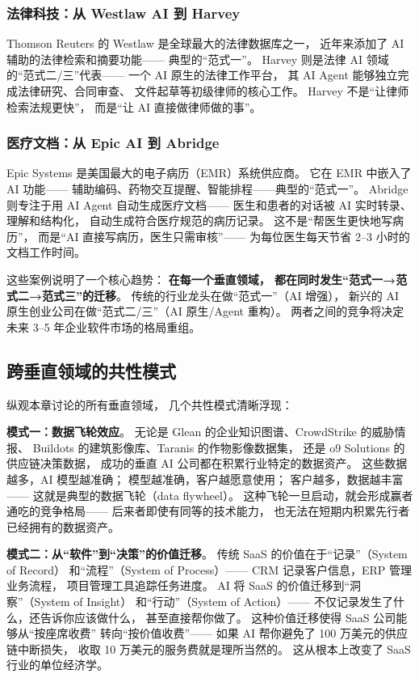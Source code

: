 \subsubsection{法律科技：从 Westlaw AI 到 Harvey}
Thomson Reuters 的 Westlaw 是全球最大的法律数据库之一，
近年来添加了 AI 辅助的法律检索和摘要功能——
典型的``范式一''。
Harvey 则是法律 AI 领域的``范式二/三''代表——
一个 AI 原生的法律工作平台，
其 AI Agent 能够独立完成法律研究、合同审查、
文件起草等初级律师的核心工作。
Harvey 不是``让律师检索法规更快''，
而是``让 AI 直接做律师做的事''。

\subsubsection{医疗文档：从 Epic AI 到 Abridge}
Epic Systems 是美国最大的电子病历（EMR）系统供应商。
它在 EMR 中嵌入了 AI 功能——
辅助编码、药物交互提醒、智能排程——典型的``范式一''。
Abridge 则专注于用 AI Agent 自动生成医疗文档——
医生和患者的对话被 AI 实时转录、理解和结构化，
自动生成符合医疗规范的病历记录。
这不是``帮医生更快地写病历''，
而是``AI 直接写病历，医生只需审核''——
为每位医生每天节省 2--3 小时的文档工作时间。

这些案例说明了一个核心趋势：
\textbf{在每一个垂直领域，
都在同时发生``范式一→范式二→范式三''的迁移}。
传统的行业龙头在做``范式一''（AI 增强），
新兴的 AI 原生创业公司在做``范式二/三''（AI 原生/Agent 重构）。
两者之间的竞争将决定未来 3--5 年企业软件市场的格局重组。

\subsection{跨垂直领域的共性模式}

纵观本章讨论的所有垂直领域，
几个共性模式清晰浮现：

\textbf{模式一：数据飞轮效应}。
无论是 Glean 的企业知识图谱、CrowdStrike 的威胁情报、
Buildots 的建筑影像库、Taranis 的作物影像数据集，
还是 o9 Solutions 的供应链决策数据，
成功的垂直 AI 公司都在积累行业特定的数据资产。
这些数据越多，AI 模型越准确；
模型越准确，客户越愿意使用；
客户越多，数据越丰富——
这就是典型的数据飞轮（data flywheel）。
这种飞轮一旦启动，就会形成赢者通吃的竞争格局——
后来者即使有同等的技术能力，
也无法在短期内积累先行者已经拥有的数据资产。

\textbf{模式二：从``软件''到``决策''的价值迁移}。
传统 SaaS 的价值在于``记录''（System of Record）
和``流程''（System of Process）——
CRM 记录客户信息，ERP 管理业务流程，
项目管理工具追踪任务进度。
AI 将 SaaS 的价值迁移到``洞察''（System of Insight）
和``行动''（System of Action）——
不仅记录发生了什么，还告诉你应该做什么，
甚至直接帮你做了。
这种价值迁移使得 SaaS 公司能够从``按座席收费''
转向``按价值收费''——
如果 AI 帮你避免了 100 万美元的供应链中断损失，
收取 10 万美元的服务费就是理所当然的。
这从根本上改变了 SaaS 行业的单位经济学。

